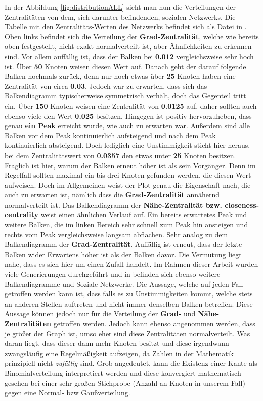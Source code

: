 In der Abbildung \ref{fig:distributionALL} sieht man nun die Verteilungen der Zentralitäten von dem, sich darunter befindenden, sozialen Netzwerks. Die Tabelle mit den Zentralitäts-Werten des Netzwerks befindet sich als Datei in \cite{TZ}. Oben links befindet sich die Verteilung der \textbf{Grad-Zentralität}, welche wie bereits oben festgestellt, nicht exakt normalverteilt ist, aber Ähnlichkeiten zu erkennen sind. Vor allem auffällig ist, dass der Balken bei \textbf{0.012} vergleichsweise sehr hoch ist. Über \textbf{50} Knoten weisen diesen Wert auf. Danach geht der darauf folgende Balken nochmals zurück, denn nur noch etwas über \textbf{25} Knoten haben eine Zentralität von circa \textbf{0.03}. Jedoch war zu erwarten, dass sich das Balkendiagramm typischerweise symmetrisch verhält, doch das Gegenteil tritt ein. Über \textbf{150} Knoten weisen eine Zentralität von \textbf{0.0125} auf, daher sollten auch ebenso viele den Wert \textbf{0.025} besitzen. Hingegen ist positiv hervorzuheben, dass genau \textbf{ein Peak} erreicht wurde, wie auch zu erwarten war. Außerdem sind alle Balken vor dem Peak kontinuierlich aufsteigend und nach dem Peak kontinuierlich absteigend. Doch lediglich eine Unstimmigkeit sticht hier heraus, bei dem Zentralitätswert von \textbf{0.0357} den etwas unter \textbf{25} Knoten besitzen. Fraglich ist hier, warum der Balken erneut höher ist als sein Vorgänger. Denn im Regelfall sollten maximal ein bis drei Knoten gefunden werden, die diesen Wert aufweisen. Doch im Allgemeinen weist der Plot genau die Eigenschaft nach, die auch zu erwarten ist, nämlich dass die \textbf{Grad-Zentralität} annähernd normalverteilt ist. Das Balkendiagramm der \textbf{Nähe-Zentralität bzw. closeness-centrality} weist einen ähnlichen Verlauf auf. Ein bereits erwartetes Peak und weitere Balken, die im linken Bereich sehr schnell zum Peak hin ansteigen und rechts vom Peak vergleichsweise langsam abflachen. Sehr analog zu dem Balkendiagramm der \textbf{Grad-Zentralität}. Auffällig ist erneut, dass der letzte Balken wider Erwartens höher ist als der Balken davor. Die Vermutung liegt nahe, dass es sich hier um einen Zufall handelt. Im Rahmen dieser Arbeit wurden viele Generierungen durchgeführt und in \cite{TZ} befinden sich ebenso weitere Balkendiagramme und Soziale Netzwerke. Die Aussage, welche auf jeden Fall getroffen werden kann ist, dass falls es zu Unstimmigkeiten kommt, welche stets an anderen Stellen auftreten und nicht immer denselben Balken betreffen. Diese Aussage können jedoch nur für die Verteilung der \textbf{Grad-} und \textbf{Nähe-Zentralitäten} getroffen werden. Jedoch kann ebenso angenommen werden, dass je größer der Graph ist, umso eher sind diese Zentralitäten normalverteilt. Was daran liegt, dass dieser dann mehr Knoten besitzt und diese irgendwann zwangsläufig eine Regelmäßigkeit aufzeigen, da Zahlen in der Mathematik prinzipiell nicht \textit{zufällig} sind. Grob angedeutet, kann die Existenz einer Kante als Binomialverteilung interpretiert werden und diese konvergiert mathematisch gesehen bei einer sehr großen Stichprobe (Anzahl an Knoten in unserem Fall) gegen eine Normal- bzw Gaußverteilung.
